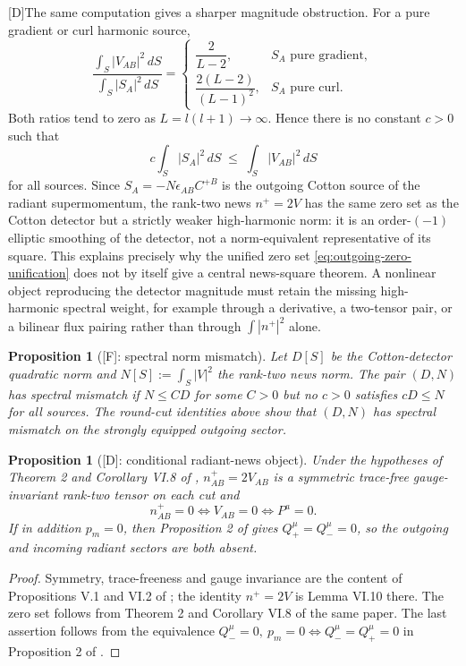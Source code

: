 \documentclass[11pt,a4paper]{article}
\newtheorem{proposition}[theorem]{Proposition}
\newcommand{\statusD}{\textsf{[D]}}
\newcommand{\statusF}{\textsf{[F]}}
\begin{document}
\statusD The same computation gives a sharper magnitude obstruction.  For a pure gradient or curl harmonic source,
\begin{equation}
  \frac{\int_S |V_{AB}|^2\,dS}{\int_S |S_A|^2\,dS}
  =
  \begin{cases}
    \dfrac{2}{L-2}, & S_A \text{ pure gradient},\\[1ex]
    \dfrac{2(L-2)}{(L-1)^2}, & S_A \text{ pure curl}.
  \end{cases}
\end{equation}
Both ratios tend to zero as \(L=l(l+1)\to\infty\).  Hence there is no constant \(c>0\) such that
\begin{equation}
  c\int_S |S_A|^2\,dS
  \;\le\;
  \int_S |V_{AB}|^2\,dS
\end{equation}
for all sources.  Since \(S_A=-N\epsilon_{AB}C^{+B}\) is the outgoing Cotton source of the radiant supermomentum, the rank-two news \(n^+=2V\) has the same zero set as the Cotton detector but a strictly weaker high-harmonic norm: it is an order-\((-1)\) elliptic smoothing of the detector, not a norm-equivalent representative of its square.  This explains precisely why the unified zero set \eqref{eq:outgoing-zero-unification} does not by itself give a central news-square theorem.  A nonlinear object reproducing the detector magnitude must retain the missing high-harmonic spectral weight, for example through a derivative, a two-tensor pair, or a bilinear flux pairing rather than through \(\int |n^+|^2\) alone.

\begin{proposition}[\statusF: spectral norm mismatch]
Let \(D[S]\) be the Cotton-detector quadratic norm and \(N[S]:=\int_S|V|^2\) the rank-two news norm.  The pair \((D,N)\) has spectral mismatch if \(N\le C D\) for some \(C>0\) but no \(c>0\) satisfies \(cD\le N\) for all sources.  The round-cut identities above show that \((D,N)\) has spectral mismatch on the strongly equipped outgoing sector.
\end{proposition}

\begin{proposition}[\statusD: conditional radiant-news object]
Under the hypotheses of Theorem 2 and Corollary VI.8 of \cite{fabSen2022asymptotic}, \(n^+_{AB}=2V_{AB}\) is a symmetric trace-free gauge-invariant rank-two tensor on each cut and
\begin{equation}
  n^+_{AB}=0
  \iff
  V_{AB}=0
  \iff
  P^a=0 .
\end{equation}
If in addition \(p_m=0\), then Proposition 2 of \cite{senovilla2022radiation} gives \(Q_+^\mu=Q_-^\mu=0\), so the outgoing and incoming radiant sectors are both absent.
\end{proposition}
\begin{proof}
Symmetry, trace-freeness and gauge invariance are the content of Propositions V.1 and VI.2 of \cite{fabSen2022asymptotic}; the identity \(n^+=2V\) is Lemma VI.10 there.  The zero set follows from Theorem 2 and Corollary VI.8 of the same paper.  The last assertion follows from the equivalence \(Q_-^\mu=0,\ p_m=0\iff Q_-^\mu=Q_+^\mu=0\) in Proposition 2 of \cite{senovilla2022radiation}.
\end{proof}
\end{document}
